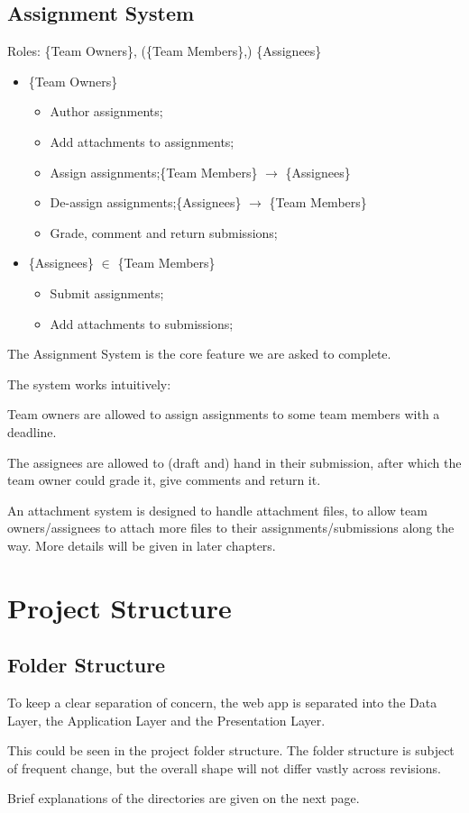 \documentclass[12pt]{report}
\newcommand{\n}{\par}
\newcommand{\br}{\vspace{1 em}\n}
\begin{document}
\subsection{Assignment System} \label{overview.project-objectives.assignment-system}
Roles: \{Team Owners\}, (\{Team Members\},) \{Assignees\}\n
\begin{itemize}
	\item \{Team Owners\}
	      \begin{itemize}
		      \item Author assignments;
		      \item Add attachments to assignments;
		      \item Assign assignments;\null\hfill \{Team Members\} $\rightarrow$ \{Assignees\}
		      \item De-assign assignments;\null\hfill \{Assignees\} $\rightarrow$ \{Team Members\}
		      \item Grade, comment and return submissions;
	      \end{itemize}
	\item \{Assignees\} $\in$ \{Team Members\}
	      \begin{itemize}
		      \item Submit assignments;
		      \item Add attachments to submissions;
	      \end{itemize}
\end{itemize}\n
The Assignment System is the core feature we are asked to complete.\n
The system works intuitively:\n
Team owners are allowed to assign assignments to some team members with a deadline.\n
The assignees are allowed to (draft and) hand in their submission,
after which the team owner could grade it, give comments and return it.
\br
An attachment system is designed to handle attachment files, to allow team owners/assignees
to attach more files to their assignments/submissions along the way.
More details will be given in later chapters.
\newpage

\section{Project Structure} \label{overview.project-structure}

\subsection{Folder Structure} \label{overview.project-structure.folder-structure}
To keep a clear separation of concern, the web app is separated into
the Data Layer, the Application Layer and the Presentation Layer.
\br
This could be seen in the project folder structure.
The folder structure is subject of frequent change, but the overall shape will not differ vastly across revisions.
\br
{}
\vspace{3 em}\n
Brief explanations of the directories are given on the next page.
\newpage
\end{document}
